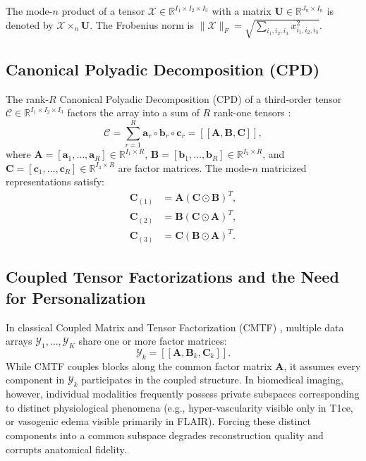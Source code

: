 \documentclass[11pt,a4paper]{article}
\begin{document}
The mode-$n$ product of a tensor $\bm{\mathcal{X}} \in \mathbb{R}^{I_1 \times I_2 \times I_3}$ with a matrix $\mathbf{U} \in \mathbb{R}^{J_n \times I_n}$ is denoted by $\bm{\mathcal{X}} \times_n \mathbf{U}$. The Frobenius norm is $\|\bm{\mathcal{X}}\|_F = \sqrt{\sum_{i_1,i_2,i_3} x_{i_1,i_2,i_3}^2}$.

\subsection{Canonical Polyadic Decomposition (CPD)}
The rank-$R$ Canonical Polyadic Decomposition (CPD) of a third-order tensor $\bm{\mathcal{C}} \in \mathbb{R}^{I_1 \times I_2 \times I_3}$ factors the array into a sum of $R$ rank-one tensors \cite{kolda2009tensor}:
\begin{equation}
\bm{\mathcal{C}} = \sum_{r=1}^R \mathbf{a}_r \circ \mathbf{b}_r \circ \mathbf{c}_r = [\![\mathbf{A}, \mathbf{B}, \mathbf{C}]\!],
\end{equation}
where $\mathbf{A} = [\mathbf{a}_1, \dots, \mathbf{a}_R] \in \mathbb{R}^{I_1 \times R}$, $\mathbf{B} = [\mathbf{b}_1, \dots, \mathbf{b}_R] \in \mathbb{R}^{I_2 \times R}$, and $\mathbf{C} = [\mathbf{c}_1, \dots, \mathbf{c}_R] \in \mathbb{R}^{I_3 \times R}$ are factor matrices. The mode-$n$ matricized representations satisfy:
\begin{align}
\mathbf{C}_{(1)} &= \mathbf{A} (\mathbf{C} \odot \mathbf{B})^T, \label{eq:unfold1}\\
\mathbf{C}_{(2)} &= \mathbf{B} (\mathbf{C} \odot \mathbf{A})^T, \label{eq:unfold2}\\
\mathbf{C}_{(3)} &= \mathbf{C} (\mathbf{B} \odot \mathbf{A})^T. \label{eq:unfold3}
\end{align}

\subsection{Coupled Tensor Factorizations and the Need for Personalization}
In classical Coupled Matrix and Tensor Factorization (CMTF) \cite{acar2011coupled, sidiropoulos2017tensor}, multiple data arrays $\bm{\mathcal{Y}}_1, \dots, \bm{\mathcal{Y}}_K$ share one or more factor matrices:
\begin{equation}
\bm{\mathcal{Y}}_k = [\![\mathbf{A}, \mathbf{B}_k, \mathbf{C}_k]\!].
\end{equation}
While CMTF couples blocks along the common factor matrix $\mathbf{A}$, it assumes every component in $\bm{\mathcal{Y}}_k$ participates in the coupled structure. In biomedical imaging, however, individual modalities frequently possess private subspaces corresponding to distinct physiological phenomena (e.g., hyper-vascularity visible only in T1ce, or vasogenic edema visible primarily in FLAIR). Forcing these distinct components into a common subspace degrades reconstruction quality and corrupts anatomical fidelity. 
\end{document}
